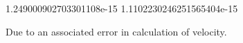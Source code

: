 
1.249000902703301108e-15
1.1102230246251565404e-15

Due to an associated error in calculation of velocity.
